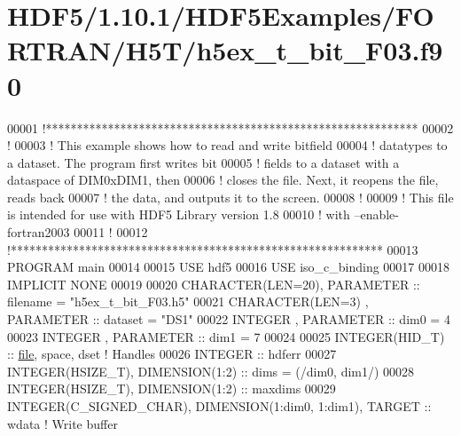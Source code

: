 \hypertarget{_h_d_f5_21_810_81_2_h_d_f5_examples_2_f_o_r_t_r_a_n_2_h5_t_2h5ex__t__bit___f03_8f90_source}{}\section{H\+D\+F5/1.10.1/\+H\+D\+F5\+Examples/\+F\+O\+R\+T\+R\+A\+N/\+H5\+T/h5ex\+\_\+t\+\_\+bit\+\_\+\+F03.f90}
\label{_h_d_f5_21_810_81_2_h_d_f5_examples_2_f_o_r_t_r_a_n_2_h5_t_2h5ex__t__bit___f03_8f90_source}

\begin{DoxyCode}
00001 \textcolor{comment}{!************************************************************}
00002 \textcolor{comment}{!}
00003 \textcolor{comment}{!  This example shows how to read and write bitfield}
00004 \textcolor{comment}{!  datatypes to a dataset.  The program first writes bit}
00005 \textcolor{comment}{!  fields to a dataset with a dataspace of DIM0xDIM1, then}
00006 \textcolor{comment}{!  closes the file.  Next, it reopens the file, reads back}
00007 \textcolor{comment}{!  the data, and outputs it to the screen.}
00008 \textcolor{comment}{!}
00009 \textcolor{comment}{!  This file is intended for use with HDF5 Library version 1.8}
00010 \textcolor{comment}{!  with --enable-fortran2003}
00011 \textcolor{comment}{!}
00012 \textcolor{comment}{!************************************************************}
00013 \textcolor{keyword}{PROGRAM} main
00014 
00015   \textcolor{keywordtype}{USE }hdf5
00016   \textcolor{keywordtype}{USE }iso\_c\_binding
00017   
00018   \textcolor{keywordtype}{IMPLICIT NONE}
00019 
00020   \textcolor{keywordtype}{CHARACTER(LEN=20)}, \textcolor{keywordtype}{PARAMETER} :: filename  = \textcolor{stringliteral}{"h5ex\_t\_bit\_F03.h5"}
00021   \textcolor{keywordtype}{CHARACTER(LEN=3)} , \textcolor{keywordtype}{PARAMETER} :: dataset   = \textcolor{stringliteral}{"DS1"}
00022   \textcolor{keywordtype}{INTEGER}          , \textcolor{keywordtype}{PARAMETER} :: dim0      = 4
00023   \textcolor{keywordtype}{INTEGER}          , \textcolor{keywordtype}{PARAMETER} :: dim1      = 7
00024 
00025   \textcolor{keywordtype}{INTEGER(HID\_T)}  :: \hyperlink{structfile}{file}, space, dset \textcolor{comment}{! Handles}
00026   \textcolor{keywordtype}{INTEGER} :: hdferr
00027   \textcolor{keywordtype}{INTEGER(HSIZE\_T)}, \textcolor{keywordtype}{DIMENSION(1:2)}   :: dims = (/dim0, dim1/)
00028   \textcolor{keywordtype}{INTEGER(HSIZE\_T)}, \textcolor{keywordtype}{DIMENSION(1:2)}   :: maxdims
00029   \textcolor{keywordtype}{INTEGER(C\_SIGNED\_CHAR)}, \textcolor{keywordtype}{DIMENSION(1:dim0, 1:dim1)}, \textcolor{keywordtype}{TARGET} :: wdata              \textcolor{comment}{! Write buffer }

\end{DoxyCode}
